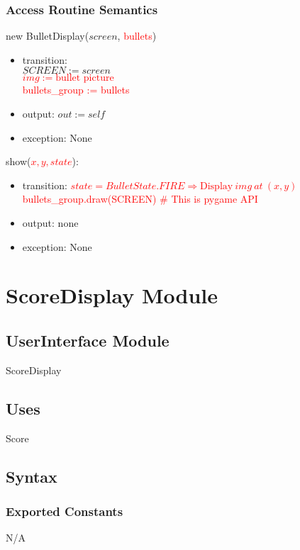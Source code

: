 \documentclass[12pt]{article}
\begin{document}
\subsubsection*{Access Routine Semantics}

new BulletDisplay($screen$, \textcolor{red}{bullets})
\begin{itemize}
     \item transition: \\$SCREEN := screen$
    \\\textcolor{red}{\st{$img := \text{bullet picture}$}}\\
    \textcolor{red}{bullets\_group := bullets}
    \item output: $out := self$
    \item exception: None
\end{itemize}

\noindent show(\textcolor{red}{\st{$x, y, state$}}):
\begin{itemize}
    \item transition: \textcolor{red}{\st{$state = BulletState.FIRE \Rightarrow \text{Display}\ img\ at\ (x, y)$}}\\
    \textcolor{red}{bullets\_group.draw(SCREEN) \# This is pygame API}
     \item output: none
    \item exception: None
\end{itemize}
\newpage

\newpage
\section{ScoreDisplay Module}

\subsection*{UserInterface Module}
ScoreDisplay
\subsection*{Uses}
Score
\subsection*{Syntax}
\subsubsection*{Exported Constants}
N/A
\end{document}
